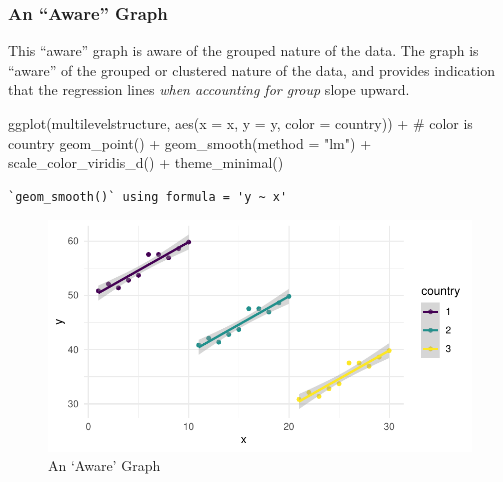 \documentclass[
  letterpaper,
  DIV=11,
  numbers=noendperiod]{scrreprt}
\newenvironment{Shaded}{\begin{snugshade}}{\end{snugshade}}
\newcommand{\AttributeTok}[1]{\textcolor[rgb]{0.40,0.45,0.13}{#1}}
\newcommand{\CommentTok}[1]{\textcolor[rgb]{0.37,0.37,0.37}{#1}}
\newcommand{\FunctionTok}[1]{\textcolor[rgb]{0.28,0.35,0.67}{#1}}
\newcommand{\NormalTok}[1]{\textcolor[rgb]{0.00,0.23,0.31}{#1}}
\newcommand{\SpecialCharTok}[1]{\textcolor[rgb]{0.37,0.37,0.37}{#1}}
\newcommand{\StringTok}[1]{\textcolor[rgb]{0.13,0.47,0.30}{#1}}
\begin{document}
\hypertarget{an-aware-graph}{%
\subsubsection{An ``Aware'' Graph}\label{an-aware-graph}}

This ``aware'' graph is aware of the grouped nature of the data. The
graph is ``aware'' of the grouped or clustered nature of the data, and
provides indication that the regression lines \emph{when accounting for
group} slope upward.

\begin{Shaded}
\begin{Highlighting}[]
\FunctionTok{ggplot}\NormalTok{(multilevelstructure, }
             \FunctionTok{aes}\NormalTok{(}\AttributeTok{x =}\NormalTok{ x,}
                 \AttributeTok{y =}\NormalTok{ y,}
                 \AttributeTok{color =}\NormalTok{ country)) }\SpecialCharTok{+} \CommentTok{\# color is country}
  \FunctionTok{geom\_point}\NormalTok{() }\SpecialCharTok{+} 
  \FunctionTok{geom\_smooth}\NormalTok{(}\AttributeTok{method =} \StringTok{"lm"}\NormalTok{) }\SpecialCharTok{+} 
  \FunctionTok{scale\_color\_viridis\_d}\NormalTok{() }\SpecialCharTok{+}
  \FunctionTok{theme\_minimal}\NormalTok{()}
\end{Highlighting}
\end{Shaded}

\begin{verbatim}
`geom_smooth()` using formula = 'y ~ x'
\end{verbatim}

\begin{figure}[H]

{\centering \includegraphics{./cross-sectional_files/figure-pdf/fig-aware-1.pdf}

}

\caption{\label{fig-aware}An `Aware' Graph}

\end{figure}
\end{document}

